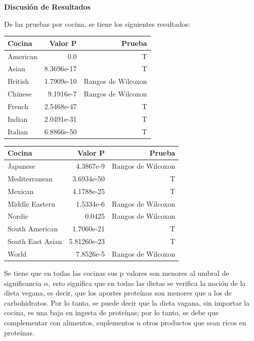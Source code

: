 \documentclass[12pt,a4paper]{article}
\begin{document}
        \textbf{Discusión de Resultados}\\
        {
            De las pruebas por cocina, se tiene los siguientes resultados: 

            \begin{center}
                \begin{tabular}{lrr}
                    \toprule
                        \textbf{Cocina} & \textbf{Valor P} & \textbf{Prueba} \\
                    \midrule
                        American & 0.0 & T \\
                        Asian & 8.3696e-17 & T \\
                        British & 1.7909e-10 & Rangos de Wilcoxon \\
                        Chinese & 9.1916e-7 & Rangos de Wilcoxon \\
                        French & 2.5468e-47 & T \\
                        Indian & 2.0491e-31 & T \\
                        Italian & 6.8866e-50 & T \\
                    \bottomrule
                \end{tabular}
                \begin{tabular}{lrr}
                    \toprule
                        \textbf{Cocina} & \textbf{Valor P} & \textbf{Prueba} \\
                    \midrule
                        Japanese & 4.3867e-9 & Rangos de Wilcoxon \\
                        Mediterranean & 3.6934e-50 & T \\
                        Mexican & 4.1788e-25 & T \\
                        Middle Eastern & 1.5334e-6 & Rangos de Wilcoxon \\
                        Nordic & 0.0425 & Rangos de Wilcoxon \\
                        South American & 1.7060e-21 & T \\
                        South East Asian & 5.81260e-23 & T \\
                        World & 7.8526e-5 & Rangos de Wilcoxon \\
                    \bottomrule
                \end{tabular}
            \end{center}

            Se tiene que en todas las cocinas sus p valores son menores al umbral de 
            significancia $\alpha$, esto significa que en todas las dietas se verifica 
            la noción de la dieta vegana, es decir, que los aportes proteínas son menores 
            que a los de carbohidratos. Por lo tanto, se puede decir que la dieta vagana, 
            sin importar la cocina, es una baja en ingesta de proteínas; por lo tanto, se 
            debe que complementar con alimentos, suplementos u otros productos que sean 
            ricos en proteínas.
        }
\end{document}
